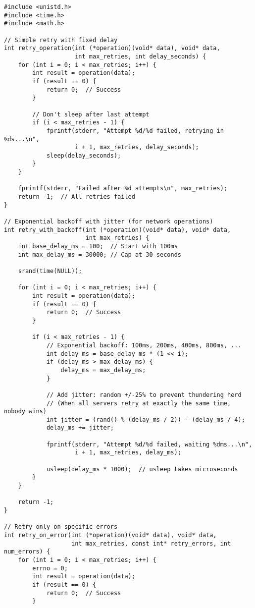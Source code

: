 \begin{lstlisting}
#include <unistd.h>
#include <time.h>
#include <math.h>

// Simple retry with fixed delay
int retry_operation(int (*operation)(void* data), void* data,
                    int max_retries, int delay_seconds) {
    for (int i = 0; i < max_retries; i++) {
        int result = operation(data);
        if (result == 0) {
            return 0;  // Success
        }

        // Don't sleep after last attempt
        if (i < max_retries - 1) {
            fprintf(stderr, "Attempt %d/%d failed, retrying in %ds...\n",
                    i + 1, max_retries, delay_seconds);
            sleep(delay_seconds);
        }
    }

    fprintf(stderr, "Failed after %d attempts\n", max_retries);
    return -1;  // All retries failed
}

// Exponential backoff with jitter (for network operations)
int retry_with_backoff(int (*operation)(void* data), void* data,
                       int max_retries) {
    int base_delay_ms = 100;  // Start with 100ms
    int max_delay_ms = 30000; // Cap at 30 seconds

    srand(time(NULL));

    for (int i = 0; i < max_retries; i++) {
        int result = operation(data);
        if (result == 0) {
            return 0;  // Success
        }

        if (i < max_retries - 1) {
            // Exponential backoff: 100ms, 200ms, 400ms, 800ms, ...
            int delay_ms = base_delay_ms * (1 << i);
            if (delay_ms > max_delay_ms) {
                delay_ms = max_delay_ms;
            }

            // Add jitter: random +/-25% to prevent thundering herd
            // (When all servers retry at exactly the same time, nobody wins)
            int jitter = (rand() % (delay_ms / 2)) - (delay_ms / 4);
            delay_ms += jitter;

            fprintf(stderr, "Attempt %d/%d failed, waiting %dms...\n",
                    i + 1, max_retries, delay_ms);

            usleep(delay_ms * 1000);  // usleep takes microseconds
        }
    }

    return -1;
}

// Retry only on specific errors
int retry_on_error(int (*operation)(void* data), void* data,
                   int max_retries, const int* retry_errors, int num_errors) {
    for (int i = 0; i < max_retries; i++) {
        errno = 0;
        int result = operation(data);
        if (result == 0) {
            return 0;  // Success
        }


\end{lstlisting}
